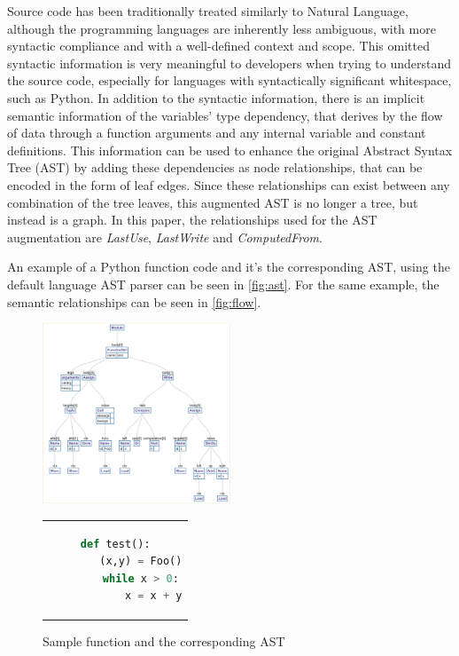 \documentclass{article}
\begin{document}
Source code has been traditionally treated similarly to Natural Language, although the programming languages are inherently less ambiguous, with more syntactic compliance and with a well-defined context and scope. This omitted syntactic information is very meaningful to developers when trying to understand the source code, especially for languages with syntactically significant whitespace, such as Python.
In addition to the syntactic information, there is an implicit semantic information of the variables' type dependency, that derives by the flow of data through a function arguments and any internal variable and constant definitions. This information can be used to enhance the original Abstract Syntax Tree (AST) by adding these dependencies as node relationships, that can be encoded in the form of leaf edges. Since these relationships can exist between any combination of the tree leaves, this augmented AST is no longer a tree, but instead is a graph. In this paper, the relationships used for the AST augmentation are \emph{LastUse}, \emph{LastWrite} and \emph{ComputedFrom}\cite{1711.00740}.

An example of a Python function code and it's  the corresponding AST, using the default language AST parser can be seen in \autoref{fig:ast}. For the same  example, the semantic relationships can be seen in \autoref{fig:flow}.

\begin{figure}[h]
\includegraphics[width=0.5\textwidth,trim=4 4 4 4,clip]{AST2.png}
 \centering
 
    \begin{center}
    \begin{tabular}{c}
    \begin{lstlisting}[language=Python]
    def test():
        (x,y) = Foo()
        while x > 0:
            x = x + y

    \end{lstlisting}
    \end{tabular}
    \end{center}

\caption{\label{fig:ast}Sample function and the corresponding AST}
\end{figure}
\end{document}

